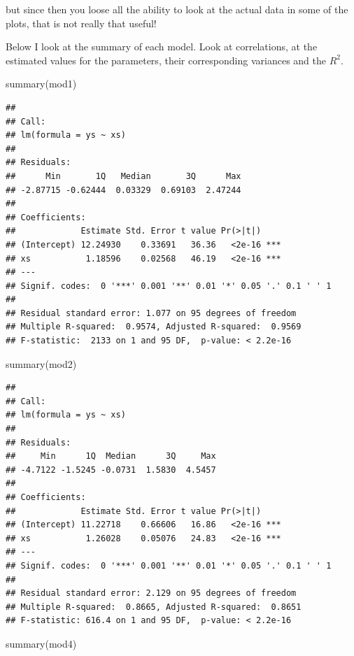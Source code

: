 \documentclass[
]{book}
\newenvironment{Shaded}{\begin{snugshade}}{\end{snugshade}}
\newcommand{\FunctionTok}[1]{\textcolor[rgb]{0.00,0.00,0.00}{#1}}
\newcommand{\NormalTok}[1]{#1}
\begin{document}
but since then you loose all the ability to look at the actual data in some of the plots, that is not really that useful!

Below I look at the summary of each model. Look at correlations, at the estimated values for the parameters, their corresponding variances and the \(R^2\).

\begin{Shaded}
\begin{Highlighting}[]
\FunctionTok{summary}\NormalTok{(mod1)}
\end{Highlighting}
\end{Shaded}

\begin{verbatim}
## 
## Call:
## lm(formula = ys ~ xs)
## 
## Residuals:
##      Min       1Q   Median       3Q      Max 
## -2.87715 -0.62444  0.03329  0.69103  2.47244 
## 
## Coefficients:
##             Estimate Std. Error t value Pr(>|t|)    
## (Intercept) 12.24930    0.33691   36.36   <2e-16 ***
## xs           1.18596    0.02568   46.19   <2e-16 ***
## ---
## Signif. codes:  0 '***' 0.001 '**' 0.01 '*' 0.05 '.' 0.1 ' ' 1
## 
## Residual standard error: 1.077 on 95 degrees of freedom
## Multiple R-squared:  0.9574, Adjusted R-squared:  0.9569 
## F-statistic:  2133 on 1 and 95 DF,  p-value: < 2.2e-16
\end{verbatim}

\begin{Shaded}
\begin{Highlighting}[]
\FunctionTok{summary}\NormalTok{(mod2)}
\end{Highlighting}
\end{Shaded}

\begin{verbatim}
## 
## Call:
## lm(formula = ys ~ xs)
## 
## Residuals:
##     Min      1Q  Median      3Q     Max 
## -4.7122 -1.5245 -0.0731  1.5830  4.5457 
## 
## Coefficients:
##             Estimate Std. Error t value Pr(>|t|)    
## (Intercept) 11.22718    0.66606   16.86   <2e-16 ***
## xs           1.26028    0.05076   24.83   <2e-16 ***
## ---
## Signif. codes:  0 '***' 0.001 '**' 0.01 '*' 0.05 '.' 0.1 ' ' 1
## 
## Residual standard error: 2.129 on 95 degrees of freedom
## Multiple R-squared:  0.8665, Adjusted R-squared:  0.8651 
## F-statistic: 616.4 on 1 and 95 DF,  p-value: < 2.2e-16
\end{verbatim}

\begin{Shaded}
\begin{Highlighting}[]
\FunctionTok{summary}\NormalTok{(mod4)}
\end{Highlighting}
\end{Shaded}
\end{document}
